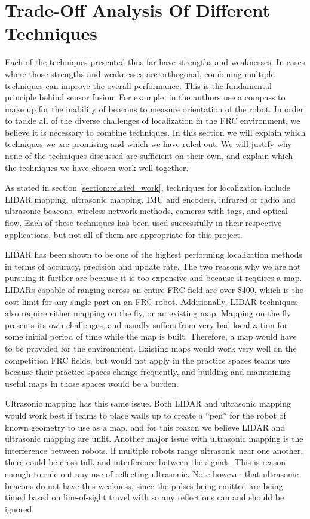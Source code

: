 \documentclass{article}
\begin{document}
\section{Trade-Off Analysis Of Different Techniques} \label{section:trade_off_analysis}

  Each of the techniques presented thus far have strengths and weaknesses. In cases where those strengths and weaknesses are orthogonal, combining multiple techniques can improve the overall performance. This is the fundamental principle behind sensor fusion. For example, in \cite{kim_advanced_2008} the authors use a compass to make up for the inability of beacons to measure orientation of the robot. In order to tackle all of the diverse challenges of localization in the FRC environment, we believe it is necessary to combine techniques. In this section we will explain which techniques we are promising and which we have ruled out. We will justify why none of the techniques discussed are sufficient on their own, and explain which the techniques we have chosen work well together.

  As stated in section \ref{section:related_work}, techniques for localization include LIDAR mapping, ultrasonic mapping, IMU and encoders, infrared or radio and ultrasonic beacons, wireless network methods, cameras with tags, and optical flow. Each of these techniques has been used successfully in their respective applications, but not all of them are appropriate for this project.

  LIDAR has been shown to be one of the highest performing localization methods in terms of accuracy, precision and update rate. The two reasons why we are not pursuing it further are because it is too expensive and because it requires a map. LIDARs capable of ranging across an entire FRC field are over \$400, which is the cost limit for any single part on an FRC robot. Additionally, LIDAR techniques also require either mapping on the fly, or an existing map. Mapping on the fly presents its own challenges, and usually suffers from very bad localization for some initial period of time while the map is built. Therefore, a map would have to be provided for the environment. Existing maps would work very well on the competition FRC fields, but would not apply in the practice spaces teams use because their practice spaces change frequently, and building and maintaining useful maps in those spaces would be a burden.

  Ultrasonic mapping has this same issue. Both LIDAR and ultrasonic mapping would work best if teams to place walls up to create a ``pen'' for the robot of known geometry to use as a map, and for this reason we believe LIDAR and ultrasonic mapping are unfit. Another major issue with ultrasonic mapping is the interference between robots. If multiple robots range ultrasonic near one another, there could be cross talk and interference between the signals. This is reason enough to rule out any use of reflecting ultrasonic. Note however that ultrasonic beacons do not have this weakness, since the pulses being emitted are being timed based on line-of-sight travel with so any reflections can and should be ignored.
\end{document}
